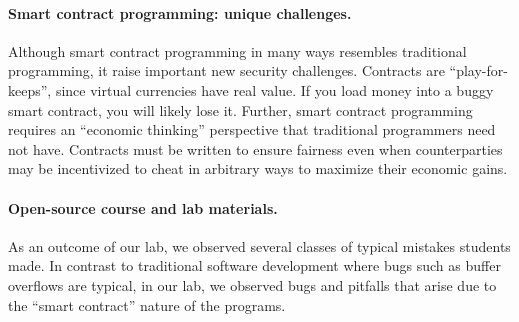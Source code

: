 \documentclass[10pt,twocolumn,letterpaper]{article}
\newcommand{\ignore}[1]{}
\begin{document}
\ignore{
The first part of this lab consists of step-by-step examples illustrating basic design of functional smart contracts. We highly recommend you take a hands-on approach, and interact with these smart contract examples using the Ethereum simulator! The accompanying materials to everything you need to get started with experimenting, including  a virtual machine image, basic instructions, and a language guide.

The second part of this lab focuses on designing smart contracts that achieve their intended goals, and are robust to attacks. 
Although our lab makes us of a simulator, the smart contracts you write can also be used in the live Ethereum network\footnote{At the time of this writing, the only live Ethereum network is a test network, since the main network has not yet launched.} The basic concepts we discuss apply to other cryptocurrencies as well (including Bitcoin), so most of what you learn will be transferable.
}

\paragraph{Smart contract programming: unique challenges.}
Although smart contract programming in many ways resembles 
traditional programming, 
it raise important new security challenges. 
Contracts are ``play-for-keeps'', since virtual currencies have real value. 
If you load money into a buggy smart contract, you will likely lose it. 
Further, smart contract programming requires
an ``economic thinking'' perspective that traditional
programmers need not have. 
Contracts must be written to ensure fairness even when
counterparties may be incentivized to cheat in arbitrary ways to maximize
their economic gains.


\paragraph{Open-source course and lab materials.}
As an outcome of our lab, we observed several classes
of typical mistakes students made. 
In contrast to  
traditional software development where 
bugs such as buffer overflows are typical, 
in our lab, we observed 
bugs and pitfalls that arise due to 
the ``smart contract'' nature of the programs. 
\end{document}
